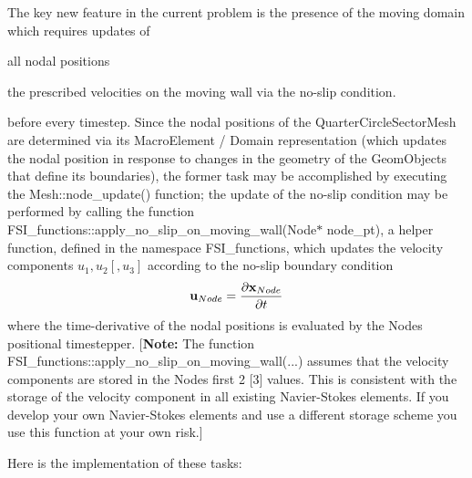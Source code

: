 The key new feature in the current problem is the presence of the moving domain which requires updates of
\begin{DoxyEnumerate}
\item all nodal positions
\item the prescribed velocities on the moving wall via the no-\/slip condition.
\end{DoxyEnumerate}before every timestep. Since the nodal positions of the {\ttfamily Quarter\+Circle\+Sector\+Mesh} are determined via its {\ttfamily Macro\+Element} / {\ttfamily Domain} representation (which updates the nodal position in response to changes in the geometry of the {\ttfamily Geom\+Objects} that define its boundaries), the former task may be accomplished by executing the {\ttfamily Mesh\+::node\+\_\+update()} function; the update of the no-\/slip condition may be performed by calling the function {\ttfamily F\+S\+I\+\_\+functions\+::apply\+\_\+no\+\_\+slip\+\_\+on\+\_\+moving\+\_\+wall(\+Node$\ast$ node\+\_\+pt)}, a helper function, defined in the namespace {\ttfamily F\+S\+I\+\_\+functions}, which updates the velocity components $ u_1, u_2 [, u_3] $ according to the no-\/slip boundary condition \[ {\bf u}_{Node} = \frac{\partial {\bf x}_{Node}}{\partial t} \] where the time-\/derivative of the nodal positions is evaluated by the {\ttfamily Node\textquotesingle{}s} positional timestepper. \mbox{[}{\bfseries Note\+:} The function {\ttfamily F\+S\+I\+\_\+functions\+::apply\+\_\+no\+\_\+slip\+\_\+on\+\_\+moving\+\_\+wall}(...) assumes that the velocity components are stored in the {\ttfamily Node\textquotesingle{}s} first 2 \mbox{[}3\mbox{]} values. This is consistent with the storage of the velocity component in all existing Navier-\/\+Stokes elements. If you develop your own Navier-\/\+Stokes elements and use a different storage scheme you use this function at your own risk.\mbox{]}

Here is the implementation of these tasks\+:


